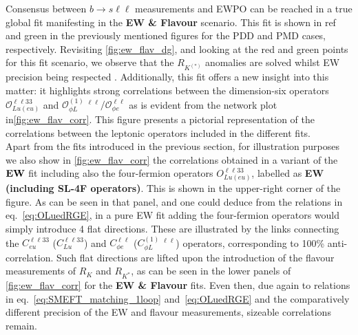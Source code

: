Consensus between $b \to s \ell \ell$ measurements and EWPO can be reached in a true global fit manifesting in the {\bf EW \& Flavour}  scenario. This fit is shown in ref and green in the previously mentioned figures for the PDD and PMD cases, respectively. Revisiting  \autoref{fig:ew_flav_dg}, and looking at the red and green points for this fit  scenario, we observe that the $R_{K^{(*)}}$ anomalies are solved whilst EW precision being respected . Additionally,  this fit offers a new insight into this matter: it highlights strong correlations between the dimension-six operators $\mathcal{O}_{Lu(eu)}^{\ell\ell33}$ and $\mathcal{O}_{\phi L}^{(1)}\ ^{\ell\ell}/\mathcal{O}_{\phi e}^ {\ell\ell}$ as is evident from the network plot in\autoref{fig:ew_flav_corr}. This figure presents a pictorial representation of the correlations between the leptonic operators included in the different fits. \\
Apart from the fits introduced in the previous section, for illustration purposes we also show in \autoref{fig:ew_flav_corr} the correlations obtained in a variant of the ${\bf EW}$ fit including also the four-fermion operators $O_{Lu(eu)}^{\ell\ell33}$, labelled as {\bf EW (including SL-4F operators)}. 
This is shown in the upper-right corner of the figure. As can be seen in that panel, and one could deduce from the relations in eq.~\eqref{eq:OLuedRGE}, in a pure EW fit adding the four-fermion operators would simply introduce 4 flat directions. These are illustrated by the links connecting the $C_{eu}^{\ell\ell 33}$ ($C_{Lu}^{\ell\ell 33}$) and $C_{\phi e}^{\ell\ell}$ ($C_{\phi L}^{(1)}\ ^{\ell\ell}$) operators, corresponding to 100\% anti-correlation.
Such flat directions are lifted upon the introduction of the flavour measurements of $R_{K}$ and $R_{K^*}$, as can be seen in the lower panels of \autoref{fig:ew_flav_corr} for the {\bf EW \& Flavour} fits.
%
Even then, due again to relations in eq.~\eqref{eq:SMEFT_matching_1loop} and~\eqref{eq:OLuedRGE} and the comparatively different precision of the EW and flavour measurements, sizeable correlations remain. 

